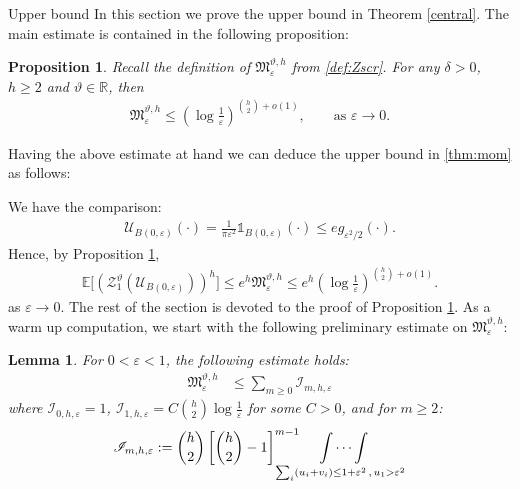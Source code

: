 \documentclass[a4paper,reqno,11pt]{amsart}
\makeatletter
\def\section{\@startsection{section}{1}%
  \z@{.7\linespacing\@plus\linespacing}{.5\linespacing}%
  {\normalfont\large\bfseries\centering}}
\renewenvironment{proof}[1][\proofname]{\par
\pushQED{\qed}%
\normalfont \topsep4\p@\@plus4\p@\relax
\trivlist
\item[\hskip\labelsep
\bfseries
#1\@addpunct{.}]\ignorespaces
}{%
\popQED\endtrivlist\@endpefalse
}
\numberwithin{equation}{section}
\theoremstyle{mytheorem}
\newtheorem{lemma}[theorem]{Lemma}
\newtheorem{proposition}[theorem]{Proposition}
\newcommand{\bbE}{{\ensuremath{\mathbb E}} }
\newcommand{\bbR}{{\ensuremath{\mathbb R}} }
\newcommand{\cU}{{\ensuremath{\mathcal U}} }
\newcommand{\gd}{\delta}
\newcommand{\gt}{\vartheta}
\newcommand{\ind}{\mathds{1}}
\renewcommand{\epsilon}{\varepsilon}
\renewcommand{\theta}{\vartheta}
\newcommand\qa{\bigg[}
\newcommand\qb{\bigg]}
\newcommand\ra{\left(}
\newcommand\rb{\right)}
\newcommand\mI{\mathscr{I}}
\newcommand{\f}{\frac}
\makeatother
\begin{document}
{\section{Upper bound}\label{sec:upper}
In this section we prove the upper bound in Theorem \ref{central}. The main estimate is contained in
the following proposition:
\begin{proposition}\label{thm: g upper bound}
Recall the definition of $\mathfrak{M}_\epsilon^{\theta,h}$ from \eqref{def:Zscr}.
For any $\gd>0$, $h\ge 2$ and $\gt\in\bbR$, then
    \begin{align}
        \mathfrak{M}_\epsilon^{\theta,h} \le \ra\log\f{1}{\epsilon}\rb^{ {h\choose 2} + o(1) }, \qquad \text{as $\epsilon\rightarrow 0$}.
    \end{align}
\end{proposition}
Having the above estimate at hand we can deduce
 the upper bound in \eqref{thm:mom} as follows:
\begin{proof}[Proof of the upper bound in Theorem \ref{central}]
 We have the comparison: 
 \begin{align*}
     \cU_{B(0,\epsilon)}(\cdot) = \f{1}{\pi\epsilon^2} \ind_{B(0,\epsilon)}(\cdot)
    \le e g_{\epsilon^2/2}( \cdot ).
 \end{align*}
 Hence, by Proposition \ref{thm: g upper bound}, 
\begin{align*}
    \bbE \qa \ra \mathscr{Z}^\gt_1 \ra \cU_{B(0,\epsilon)} \rb \rb^h \qb
    \le e^h \mathfrak{M}_\epsilon^{\theta,h} 
    \le e^h \ra\log\f{1}{\epsilon}\rb^{ {h\choose 2}+o(1) }.
\end{align*} 
as $\epsilon\rightarrow 0$.
 \end{proof}
The rest of the section is devoted to the proof of Proposition  \ref{thm: g upper bound}.
As a warm up computation, we start with the following preliminary estimate on 
 $\mathfrak{M}_\epsilon^{\theta,h}$:
\begin{lemma}\label{lemma: sum over spatial variables}
    For $0<\epsilon<1$, the following estimate holds:
    \begin{align}\label{before replica}
    \mathfrak{M}_\epsilon^{\theta,h}
    & \le \sum_{m\ge 0} \mI_{m,h,\epsilon}
    \end{align}
    where $\mI_{0,h,\epsilon}=1$, $\mI_{1,h,\epsilon}=C{h\choose 2}\log\f{1}{\epsilon}$ for some $C>0$, and for $m\ge 2$:
    \begin{align}\label{eq: I1}
    \mI_{m,h,\epsilon}:=
    {h \choose 2} \left[ {h\choose 2} -1 \right]^{m-1}
    \hskip -.5cm
    \idotsint\limits_{ \sum_i(u_i+v_i)\le 1+\epsilon^2\, ,\, u_1 >\epsilon^2}   

\end{align}
\end{lemma}}
\end{document}
